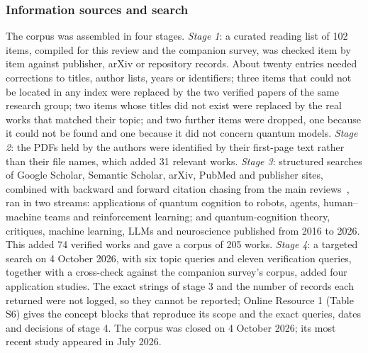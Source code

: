 \documentclass[pdflatex,sn-basic]{sn-jnl}
\begin{document}
\subsubsection{Information sources and search}\label{sec:search}
The corpus was assembled in four stages. \emph{Stage 1}: a curated reading list of 102 items, compiled for this review and the companion survey, was checked item by item against publisher, arXiv or repository records. About twenty entries needed corrections to titles, author lists, years or identifiers; three items that could not be located in any index were replaced by the two verified papers of the same research group; two items whose titles did not exist were replaced by the real works that matched their topic; and two further items were dropped, one because it could not be found and one because it did not concern quantum models. \emph{Stage 2}: the PDFs held by the authors were identified by their first-page text rather than their file names, which added 31 relevant works. \emph{Stage 3}: structured searches of Google Scholar, Semantic Scholar, arXiv, PubMed and publisher sites, combined with backward and forward citation chasing from the main reviews~\citep{Pothos2022,Huang2025b,Widdows2021,Meyer2022}, ran in two streams: applications of quantum cognition to robots, agents, human--machine teams and reinforcement learning; and quantum-cognition theory, critiques, machine learning, LLMs and neuroscience published from 2016 to 2026. This added 74 verified works and gave a corpus of 205 works. \emph{Stage 4}: a targeted search on 4 October 2026, with six topic queries and eleven verification queries, together with a cross-check against the companion survey's corpus, added four application studies. The exact strings of stage 3 and the number of records each returned were not logged, so they cannot be reported; Online Resource 1 (Table S6) gives the concept blocks that reproduce its scope and the exact queries, dates and decisions of stage 4. The corpus was closed on 4 October 2026; its most recent study appeared in July 2026.
\end{document}
